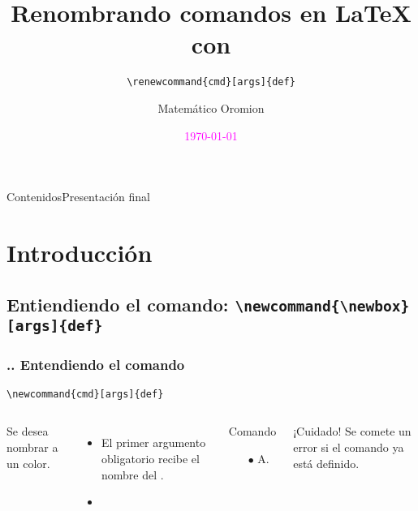 \documentclass[12pt]{beamer}
\begin{document}
\author{Matemático Oromion}
\title{\Large Renombrando comandos en \LaTeX{} con}
\cprotect\subtitle{\verb|\renewcommand{cmd}[args]{def}|}
\date{\textcolor{magenta}{\today}}
\subject{Fin del curso}

\begin{frame}[plain]
	\maketitle
\end{frame}

\begin{frame}{Contenidos}{Presentación final}
\tableofcontents
\end{frame}

\section{Introducción}
\cprotect\subsection{Entiendiendo el comando: \verb!\newcommand{\newbox}[args]{def}!}

\begin{frame}[fragile]
\frametitle{\thesection.\thesubsection. Entendiendo el comando }
\vspace*{-2cm}
\centering
\verb|\newcommand{cmd}[args]{def}|

\begin{columns}
Se desea nombrar a un color.

\begin{itemize}
	\item El primer argumento obligatorio recibe el nombre del .
	\item 
\end{itemize}
\begin{examples}{Comando }
\begin{enumerate}
\item[$\bullet$] A.
\end{enumerate}
\end{examples}

\begin{alertblock}{¡Cuidado!}
Se comete un error si el comando ya está definido.
\end{alertblock}
\end{columns}

\end{frame}
\end{document}
